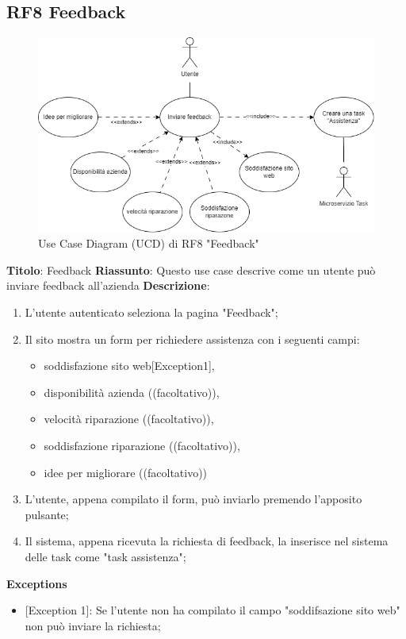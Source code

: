 \documentclass{report}
\begin{document}
\subsection*{RF8 Feedback}

\begin{figure}[H]
	\centering\includegraphics[width=1\textwidth]{images/UCD/RF8_feedback_UCD.png}
	Use Case Diagram (UCD) di RF8 "Feedback"
\end{figure}
\textbf{Titolo}: Feedback\newline
\textbf{Riassunto}: Questo use case descrive come un utente può inviare feedback all'azienda  \newline
\textbf{Descrizione}:
	\begin{enumerate}
		\item L'utente autenticato seleziona la pagina "Feedback";
		\item Il sito mostra un form per richiedere assistenza con i seguenti campi:
		\begin{itemize}
			\item soddisfazione sito web[Exception1],
			\item disponibilità azienda ((facoltativo)),
			\item velocità riparazione ((facoltativo)),
			\item soddisfazione riparazione ((facoltativo)),
			\item idee per migliorare ((facoltativo))
		\end{itemize}
		\item L'utente, appena compilato il form, può inviarlo premendo l'apposito pulsante;
		\item Il sistema, appena ricevuta la richiesta di feedback, la inserisce nel sistema delle task come "task assistenza";
		
	\end{enumerate}
\textbf{Exceptions}
\begin{itemize}
	\item {[Exception 1]}: Se l'utente non ha compilato il campo "soddifsazione sito web" non può inviare la richiesta;
\end{itemize}
\end{document}
